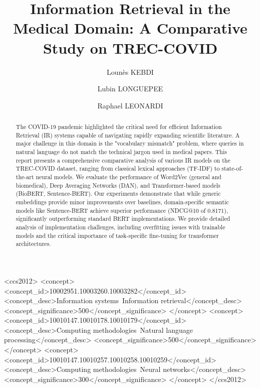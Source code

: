 \documentclass[sigconf,nonacm]{acmart}
\begin{document}
\sloppy

\title{Information Retrieval in the Medical Domain: A Comparative Study on TREC-COVID}

\author{Lounès KEBDI}

\author{Lubin LONGUEPEE}

\author{Raphael LEONARDI}

\begin{abstract}
The COVID-19 pandemic highlighted the critical need for efficient Information Retrieval (IR) systems capable of navigating rapidly expanding scientific literature. A major challenge in this domain is the "vocabulary mismatch" problem, where queries in natural language do not match the technical jargon used in medical papers. This report presents a comprehensive comparative analysis of various IR models on the TREC-COVID dataset, ranging from classical lexical approaches (TF-IDF) to state-of-the-art neural models. We evaluate the performance of Word2Vec (general and biomedical), Deep Averaging Networks (DAN), and Transformer-based models (BioBERT, Sentence-BERT). Our experiments demonstrate that while generic embeddings provide minor improvements over baselines, domain-specific semantic models like Sentence-BERT achieve superior performance (NDCG@10 of 0.8171), significantly outperforming standard BERT implementations. We provide detailed analysis of implementation challenges, including overfitting issues with trainable models and the critical importance of task-specific fine-tuning for transformer architectures.
\end{abstract}

\begin{CCSXML}
<ccs2012>
<concept>
<concept_id>10002951.10003260.10003282</concept_id>
<concept_desc>Information systems~Information retrieval</concept_desc>
<concept_significance>500</concept_significance>
</concept>
<concept>
<concept_id>10010147.10010178.10010179</concept_id>
<concept_desc>Computing methodologies~Natural language processing</concept_desc>
<concept_significance>500</concept_significance>
</concept>
<concept>
<concept_id>10010147.10010257.10010258.10010259</concept_id>
<concept_desc>Computing methodologies~Neural networks</concept_desc>
<concept_significance>300</concept_significance>
</concept>
</ccs2012>
\end{CCSXML}
\end{document}
